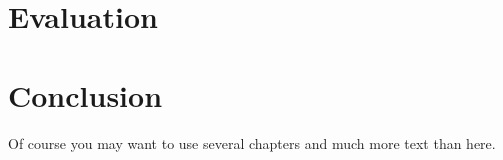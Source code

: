 \documentclass[bsc,logo,frontabs,twoside,singlespacing,normalheadings,parskip]{infthesis}     %
\begin{document}
\chapter{Evaluation}




\chapter{Conclusion}

Of course
you may want to use several chapters and much more text than here.



\end{document}

